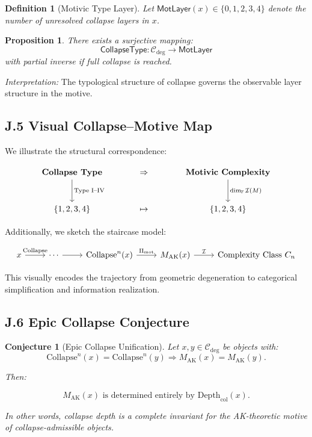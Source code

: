 \documentclass[11pt]{article}
\newtheorem{definition}[theorem]{Definition}
\newtheorem{proposition}[theorem]{Proposition}
\newtheorem{conjecture}{Conjecture}[section]
\begin{document}
\begin{definition}[Motivic Type Layer]
Let $\mathsf{MotLayer}(x) \in \{0,1,2,3,4\}$ denote the number of unresolved collapse layers in $x$.
\end{definition}

\begin{proposition}
There exists a surjective mapping:
\[
\mathsf{CollapseType} : \mathcal{C}_{\mathrm{deg}} \rightarrow \mathsf{MotLayer}
\]
with partial inverse if full collapse is reached.
\end{proposition}

\textit{Interpretation:} The typological structure of collapse governs the observable layer structure in the motive.

\subsection*{J.5 Visual Collapse–Motive Map}

We illustrate the structural correspondence:

\[
\begin{tikzcd}[column sep=large, row sep=large]
\textbf{Collapse Type} \arrow[d, "\text{Type I–IV}"]
& \Rightarrow
& \textbf{Motivic Complexity} \arrow[d, "\dim_{\mathbb{F}} \mathcal{I}(M)"] \\
\{1,2,3,4\}
& \mapsto
& \{1,2,3,4\}
\end{tikzcd}
\]

Additionally, we sketch the staircase model:

\[
\begin{tikzcd}[row sep=huge]
x \arrow[r, "\mathrm{Collapse}"]
& \cdots \arrow[r]
& \mathrm{Collapse}^n(x) \arrow[r, "\Pi_{\mathrm{mot}}"]
& M_{\mathrm{AK}}(x) \arrow[r, "\mathcal{I}"]
& \text{Complexity Class } C_n
\end{tikzcd}
\]

This visually encodes the trajectory from geometric degeneration to categorical simplification and information realization.

\subsection*{J.6 Epic Collapse Conjecture}

\begin{conjecture}[Epic Collapse Unification]
Let $x, y \in \mathcal{C}_{\mathrm{deg}}$ be objects with:
\[
\mathrm{Collapse}^n(x) = \mathrm{Collapse}^n(y) \Rightarrow M_{\mathrm{AK}}(x) = M_{\mathrm{AK}}(y).
\]

Then:

\[
M_{\mathrm{AK}}(x) \text{ is determined entirely by } \mathrm{Depth}_{\mathrm{col}}(x).
\]

In other words, collapse depth is a complete invariant for the AK-theoretic motive of collapse-admissible objects.
\end{conjecture}
\end{document}
